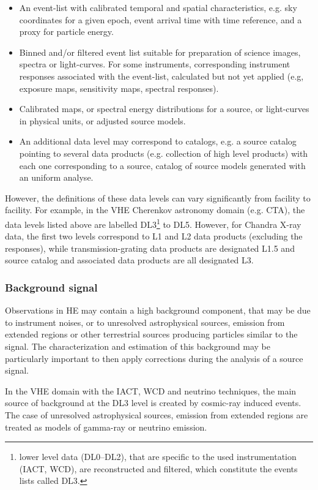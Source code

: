 \documentclass[11pt,a4paper]{ivoa}
\begin{document}
\begin{itemize}
    \item[1] An event-list with calibrated temporal and spatial characteristics, e.g. sky coordinates for a given epoch, event arrival time with time reference, and a proxy for particle energy.
    \item[2] Binned and/or filtered event list suitable for preparation of science images, spectra or light-curves.  For some instruments, corresponding instrument responses associated with the event-list, calculated but not yet applied (e.g, exposure maps, sensitivity maps, spectral responses).
    \item[3] Calibrated maps, or spectral energy distributions for a source, or light-curves in physical units, or adjusted source models.
    \item[4] An additional data level may correspond to catalogs, e.g. a source catalog pointing to several data products (e.g. collection of high level products) with each one corresponding to a source, catalog of source models generated with an uniform analyse.
\end{itemize}

However, the definitions of these data levels can vary significantly from facility to facility. For example, in the VHE Cherenkov astronomy domain (e.g. CTA), the data levels listed above are labelled DL3\footnote{lower
level data (DL0--DL2), that are specific to the used instrumentation (IACT, WCD), are reconstructed and filtered, which
constitute the events lists called DL3.} to DL5.  However, for Chandra X-ray data, the first two levels correspond  to L1 and L2 data products (excluding the responses), while transmission-grating data products are designated L1.5 and source catalog and associated data products are all designated L3.


\subsubsection{Background signal}

Observations in HE may contain a high background component, that may be due to instrument noises, or to unresolved astrophysical sources, emission from extended regions or other terrestrial sources producing particles similar to the signal. The characterization and estimation of this background may be particularly important to then apply corrections during the analysis of a source signal.

In the VHE domain with the IACT, WCD and neutrino techniques, the main source of background at the DL3 level is created by cosmic-ray induced events. The case of unresolved astrophysical sources, emission from extended regions are treated as models of gamma-ray or neutrino emission.
\end{document}
